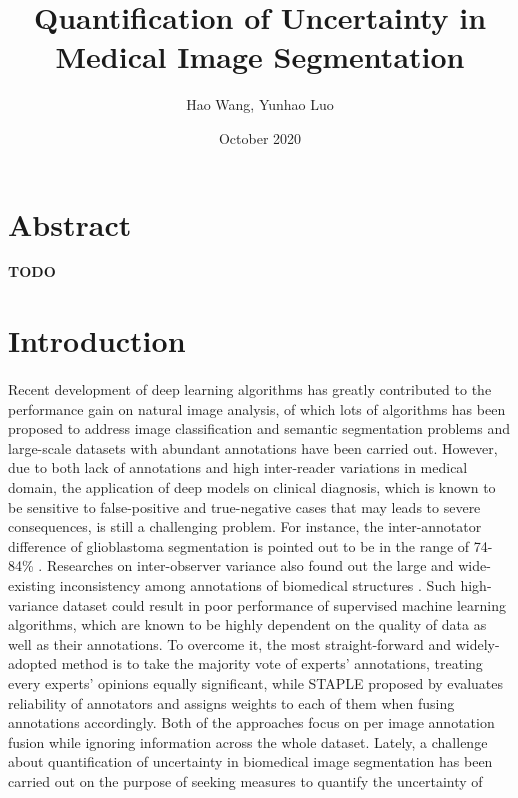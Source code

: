 \documentclass[12pt]{extarticle}
\title{Quantification of Uncertainty in Medical Image Segmentation}
\author{Hao Wang, Yunhao Luo}
\date{October 2020}
\begin{document}
\maketitle
\section*{Abstract}
\textbf{TODO}
\section{Introduction}
\paragraph{}
Recent development of deep learning algorithms has greatly contributed to
the performance gain on natural image analysis, of which lots
of algorithms has been proposed to address image classification and semantic
segmentation problems and large-scale datasets with abundant annotations have been
carried out\cite{nair_precup_arnold_arbel_2020}.
However, due to
both lack of annotations and high inter-reader variations\cite{zhang2020disentangling}
in medical domain, the application of deep models on clinical diagnosis,
which is known to be sensitive to false-positive and true-negative cases that may leads
to severe consequences, is still a challenging problem.
For instance, the inter-annotator difference of glioblastoma segmentation
is pointed out to be in the range of 74-84\% \cite{6975210}.
Researches on inter-observer variance also found out
the large and wide-existing inconsistency among annotations of biomedical structures
\cite{Variability2019}\cite{interobserver2018}. Such high-variance dataset 
could result in poor performance of supervised machine learning algorithms,
which are known to be highly dependent on the quality of data as well as their annotations.
To overcome it, the most straight-forward and widely-adopted method 
is to take the majority vote of experts' annotations, treating every 
experts' opinions equally significant\cite{6975210}, while STAPLE proposed by \cite{STAPLE} 
evaluates reliability of annotators and assigns weights to each of them when 
fusing annotations accordingly. Both of the approaches focus on per image annotation fusion
while ignoring information across the whole dataset\cite{zhang2020disentangling}.
Lately, a challenge about quantification of uncertainty 
in biomedical image segmentation has been carried
out on the purpose of seeking measures to quantify the uncertainty of 
\end{document}
